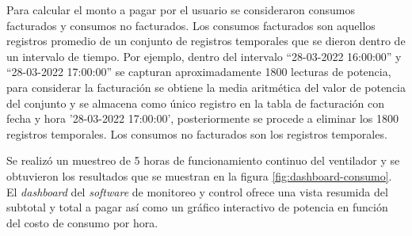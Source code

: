 Para calcular el monto a pagar por el usuario se consideraron consumos facturados y consumos no facturados. Los consumos facturados son aquellos registros promedio de un conjunto de registros temporales que se dieron dentro de un intervalo de tiempo. Por ejemplo, dentro del intervalo ``28-03-2022 16:00:00'' y ``28-03-2022 17:00:00'' se capturan aproximadamente 1800 lecturas de potencia, para considerar la facturación se obtiene la media aritmética del valor de potencia del conjunto y se almacena como único registro en la tabla de facturación con fecha y hora '28-03-2022 17:00:00', posteriormente se procede a eliminar los 1800 registros temporales. Los consumos no facturados son los registros temporales. 

Se realizó un muestreo de 5 horas de funcionamiento continuo del ventilador y se obtuvieron los resultados que se muestran en la figura \ref{fig:dashboard-consumo}. El \emph{dashboard} del \emph{software} de monitoreo y control ofrece una vista resumida del subtotal y total a pagar así como un gráfico interactivo de potencia en función del costo de consumo por hora.

